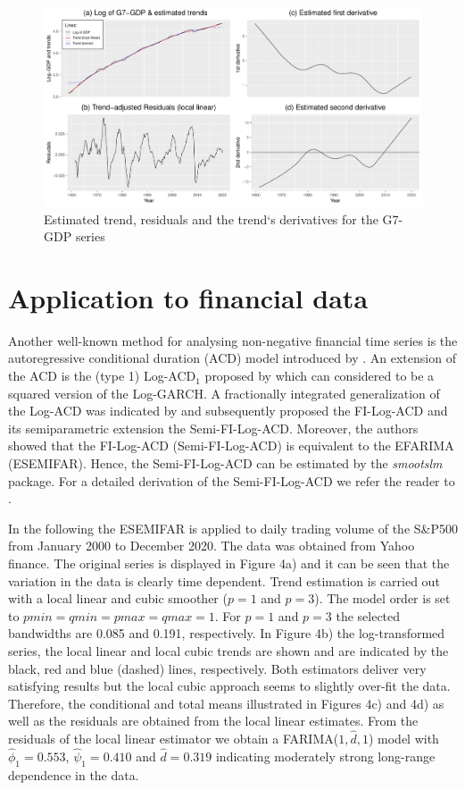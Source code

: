\documentclass[12pt]{article}
\begin{document}
\begin{figure}[h!]
	\includegraphics[trim = {0cm 0mm 0mm 0mm}, width = \textwidth]{Abb/G7gdp.pdf}
	\caption{Estimated trend, residuals and the trend`s derivatives for the G7-GDP series}
\end{figure}


\section{Application to financial data}
 Another well-known method for analysing non-negative financial time series is the autoregressive conditional duration (ACD) model introduced by \citet{engle1998autoregressive}. An extension of the ACD is the (type 1) Log-ACD$_1$ proposed by \citet{bauwens2008moments} which can considered to be a squared version of the Log-GARCH. A fractionally integrated generalization of the Log-ACD was indicated by \citet{beran2015modelling} and subsequently \citet{feng2015forecasting} proposed the FI-Log-ACD and its semiparametric extension the Semi-FI-Log-ACD. Moreover, the authors showed that the FI-Log-ACD (Semi-FI-Log-ACD) is equivalent to the EFARIMA (ESEMIFAR). Hence, the Semi-FI-Log-ACD can be estimated by the \textit{smootslm} package. For a detailed derivation of the Semi-FI-Log-ACD we refer the reader to \citet{feng2015forecasting}.

 In the following the ESEMIFAR is applied to daily trading volume of the S\&P500 from January 2000 to December 2020. The data was obtained from Yahoo finance. The original series is displayed in Figure 4a) and it can be seen that the variation in the data is clearly time dependent. Trend estimation is carried out with a local linear and cubic smoother ($p = 1$ and $p = 3$). The model order is set to  $\textit{pmin} = \textit{qmin} = \textit{pmax} = \textit{qmax} = 1$. For $p=1$ and $p=3$ the selected bandwidths are 0.085 and 0.191, respectively. In Figure 4b) the log-transformed series, the local linear and local cubic trends are shown and are indicated by the black, red and blue (dashed) lines, respectively. Both estimators deliver very satisfying results but the local cubic approach seems to slightly over-fit the data. Therefore, the conditional and total means illustrated in Figures 4c) and 4d) as well as the residuals are obtained from the local linear estimates. From the residuals of the local linear estimator we obtain a FARIMA($1, \hat{d}, 1$) model with $\hat{\phi}_1 = 0.553$, $\hat{\psi}_1 = 0.410$ and $\hat{d} = 0.319$ indicating moderately strong long-range dependence in the data. 
 
\end{document}
